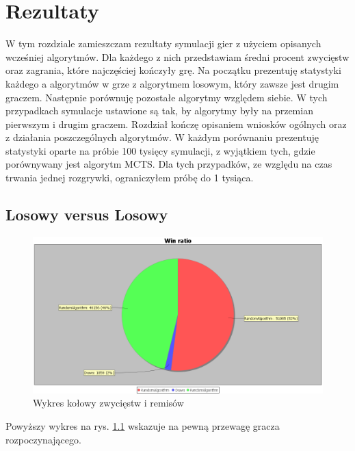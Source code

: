 \chapter{Rezultaty}
\label{cha:rozdz5}

W tym rozdziale zamieszczam rezultaty symulacji gier z użyciem opisanych wcześniej algorytmów. Dla każdego z nich przedstawiam średni procent zwycięstw oraz zagrania, które najczęściej kończyły grę. Na początku prezentuję statystyki każdego a algorytmów w grze z algorytmem losowym, który zawsze jest drugim graczem. Następnie porównuję pozostałe algorytmy względem siebie. W tych przypadkach symulacje ustawione są tak, by algorytmy były na przemian pierwszym i drugim graczem. Rozdział kończę opisaniem wniosków ogólnych oraz z działania poszczególnych algorytmów.
W każdym porównaniu prezentuję statystyki oparte na próbie 100 tysięcy symulacji, z wyjątkiem tych, gdzie porównywany jest algorytm MCTS. Dla tych przypadków, ze względu na czas trwania jednej rozgrywki, ograniczyłem próbę do 1 tysiąca.

\section{Losowy versus Losowy}

\begin{figure}[H]
	\centering
	\includegraphics[width=\textwidth]{Resources/RVsR/RVsRwin.PNG}
	\caption{Wykres kołowy zwycięstw i remisów} 
	\label{fig:RVsRwin}
\end{figure}

Powyższy wykres na rys. \ref{fig:RVsRwin} wskazuje na pewną przewagę gracza rozpoczynającego.

